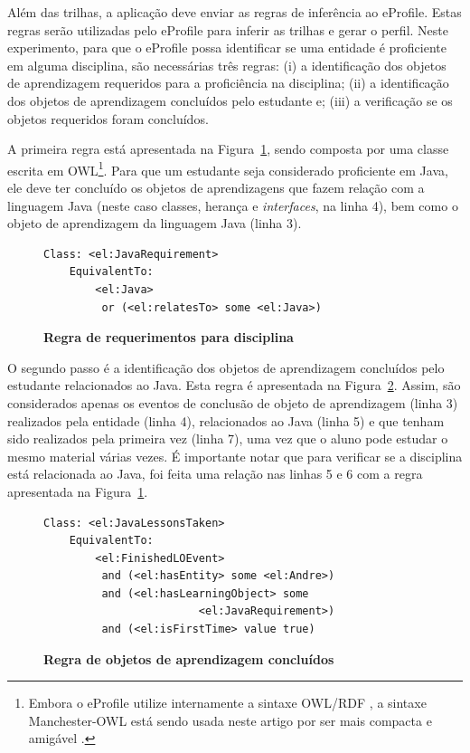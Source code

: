 \documentclass[times, 10pt, twocolumn]{article}
\begin{document}
Além das trilhas, a aplicação deve enviar as regras de inferência ao eProfile. Estas regras serão utilizadas pelo eProfile para inferir as trilhas e gerar o perfil. Neste experimento, para que o eProfile possa identificar se uma entidade é proficiente em alguma disciplina, são necessárias três regras: (i) a identificação dos objetos de aprendizagem requeridos para a proficiência na disciplina; (ii) a identificação dos objetos de aprendizagem concluídos pelo estudante e; (iii) a verificação se os objetos requeridos foram concluídos.

A primeira regra está apresentada na Figura~\ref{cod:regra1}, sendo composta por uma classe escrita em OWL\footnote{Embora o eProfile utilize internamente a sintaxe OWL/RDF \cite{owl-guide}, a sintaxe Manchester-OWL está sendo usada neste artigo por ser mais compacta e amigável \cite{owl-manchester}.}. Para que um estudante seja considerado proficiente em Java, ele deve ter concluído os objetos de aprendizagens que fazem relação com a linguagem Java (neste caso classes, herança e {\em interfaces}, na linha 4), bem como o objeto de aprendizagem da linguagem Java (linha 3). 

\begin{figure}
\begin{lstlisting}
Class: <el:JavaRequirement>
    EquivalentTo: 
        <el:Java>
         or (<el:relatesTo> some <el:Java>)
\end{lstlisting}
\caption{\textbf{Regra de requerimentos para disciplina}}
\label{cod:regra1}
\end{figure}

O segundo passo é a identificação dos objetos de aprendizagem concluídos pelo estudante relacionados ao Java. Esta regra é apresentada na Figura~\ref{cod:regra2}. Assim, são considerados apenas os eventos de conclusão de objeto de aprendizagem (linha 3) realizados pela entidade (linha 4), relacionados ao Java (linha 5) e que tenham sido realizados pela primeira vez (linha 7), uma vez que o aluno pode estudar o mesmo material várias vezes. É importante notar que para verificar se a disciplina está relacionada ao Java, foi feita uma relação nas linhas 5 e 6 com a regra apresentada na Figura~\ref{cod:regra1}.

\begin{figure}
\begin{lstlisting}
Class: <el:JavaLessonsTaken>
    EquivalentTo: 
        <el:FinishedLOEvent>
         and (<el:hasEntity> some <el:Andre>)
         and (<el:hasLearningObject> some 
	                    <el:JavaRequirement>)
         and (<el:isFirstTime> value true)
\end{lstlisting}
\caption{\textbf{Regra de objetos de aprendizagem concluídos}}
\label{cod:regra2}
\end{figure}
\end{document}
